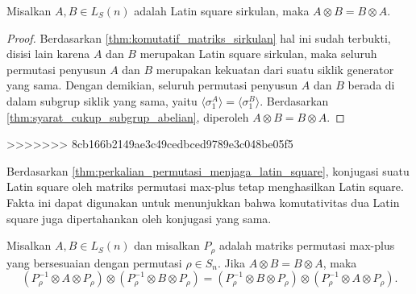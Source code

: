 \begin{akibat}\label{akibat:latin_square_sirkulan_komutatif}
  Misalkan $A,B\in L_S(n)$ adalah Latin square sirkulan, maka $A\otimes B=B\otimes A$.
\end{akibat}

\begin{proof}
  Berdasarkan \autoref{thm:komutatif_matriks_sirkulan} hal ini sudah terbukti, disisi lain karena $A$ dan $B$ merupakan Latin square sirkulan, maka seluruh permutasi penyusun $A$ dan $B$ merupakan kekuatan dari suatu siklik generator yang sama. Dengan demikian, seluruh permutasi penyusun $A$ dan $B$ berada di dalam subgrup siklik yang sama, yaitu $\langle \sigma_1^A\rangle=\langle \sigma_1^B\rangle$. Berdasarkan \autoref{thm:syarat_cukup_subgrup_abelian}, diperoleh $A\otimes B=B\otimes A$.
\end{proof}
>>>>>>> 8cb166b2149ae3c49cedbced9789e3c048be05f5

Berdasarkan \autoref{thm:perkalian_permutasi_menjaga_latin_square},
konjugasi suatu Latin square oleh matriks permutasi max-plus tetap
menghasilkan Latin square. Fakta ini dapat digunakan untuk menunjukkan bahwa
komutativitas dua Latin square juga dipertahankan oleh konjugasi yang sama.

\begin{akibat}\label{akibat:konjugasi_menjaga_komutatif}
  Misalkan $A,B\in L_S(n)$ dan misalkan $P_\rho$ adalah matriks permutasi
  max-plus yang bersesuaian dengan permutasi $\rho\in S_n$. Jika
  $A\otimes B=B\otimes A$, maka
  \[
    (P_\rho^{-1}\otimes A\otimes P_\rho)
    \otimes
    (P_\rho^{-1}\otimes B\otimes P_\rho)
    =
    (P_\rho^{-1}\otimes B\otimes P_\rho)
    \otimes
    (P_\rho^{-1}\otimes A\otimes P_\rho).
  \]
\end{akibat}

